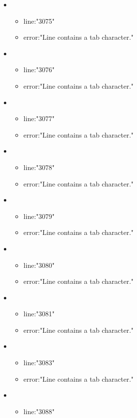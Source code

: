 \begin{itemize}
	\item 
	\begin{itemize} 
		\item line:"3075" 
		\item error:"Line contains a tab character." 
	\end{itemize}
	\item 
	\begin{itemize} 
		\item line:"3076" 
		\item error:"Line contains a tab character." 
	\end{itemize}
	\item 
	\begin{itemize} 
		\item line:"3077" 
		\item error:"Line contains a tab character." 
	\end{itemize}
	\item 
	\begin{itemize} 
		\item line:"3078" 
		\item error:"Line contains a tab character." 
	\end{itemize}
	\item 
	\begin{itemize} 
		\item line:"3079" 
		\item error:"Line contains a tab character." 
	\end{itemize}
	\item 
	\begin{itemize} 
		\item line:"3080" 
		\item error:"Line contains a tab character." 
	\end{itemize}
	\item 
	\begin{itemize} 
		\item line:"3081" 
		\item error:"Line contains a tab character." 
	\end{itemize}
	\item 
	\begin{itemize} 
		\item line:"3083" 
		\item error:"Line contains a tab character." 
	\end{itemize}
	\item 
	\begin{itemize} 
		\item line:"3088" 

\end{itemize}
\end{itemize}
